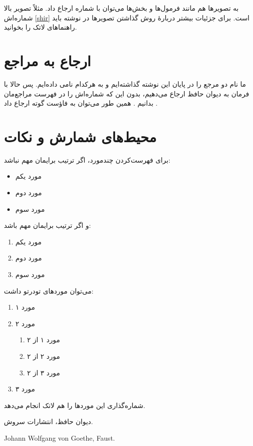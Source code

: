 \documentclass[10pt]{article}
\begin{document}
	به تصویرها هم مانند فرمول‌ها و بخش‌ها می‌توان با شماره ارجاع داد. مثلاً تصویر بالا شماره‌اش \ref{shir} است. برای جزئیات بیشتر دربارهٔ روش گذاشتن تصویرها در نوشته باید راهنماهای لاتک را بخوانید.
	\section{ارجاع به مراجع}
	ما نام دو مرجع را در پایان این نوشته گذاشته‌ایم و به هرکدام نامی داده‌ایم. پس حالا با فرمان  به دیوان حافظ ارجاع می‌دهیم، بدون این که شماره‌اش را در فهرست مراجع‌مان بدانیم \cite{حافظ}. همین طور می‌توان به فاؤست گوته ارجاع داد \cite{faust}.
	\section{محیط‌های شمارش و نکات}
	برای فهرست‌کردن چندمورد، اگر ترتیب برایمان مهم نباشد:
	\begin{itemize}
		\item مورد یکم
		\item مورد دوم
		\item مورد سوم
	\end{itemize}
	و اگر ترتیب برایمان مهم باشد:
	\begin{enumerate}
		\item مورد یکم
		\item مورد دوم
		\item مورد سوم
	\end{enumerate}
	می‌توان موردهای تودرتو داشت:
	\begin{enumerate}
		\item مورد ۱
		\item مورد ۲
		\begin{enumerate}
			\item مورد ۱ از ۲
			\item مورد ۲ از ۲
			\item مورد ۳ از ۲
		\end{enumerate}
		\item مورد ۳
	\end{enumerate}
	شماره‌گذاری این موردها را هم لاتک انجام می‌دهد.
	
	
	\begin{thebibliography}{9}
		دیوان حافظ، انتشارات سروش.
		\begin{LTRbibitems}
			\resetlatinfont
			Johann Wolfgang von Goethe, Faust.
			
		\end{LTRbibitems}
		
	\end{thebibliography}
	
\end{document}
